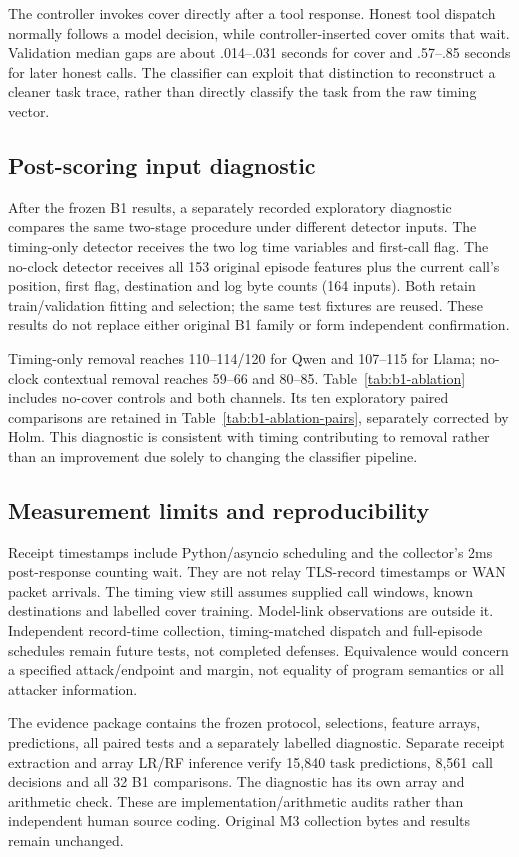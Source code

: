 The controller invokes cover directly after a tool response. Honest tool dispatch normally follows a model decision, while controller-inserted cover omits that wait. Validation median gaps are about .014--.031 seconds for cover and .57--.85 seconds for later honest calls. The classifier can exploit that distinction to reconstruct a cleaner task trace, rather than directly classify the task from the raw timing vector.

\subsection{Post-scoring input diagnostic}
After the frozen B1 results, a separately recorded exploratory diagnostic compares the same two-stage procedure under different detector inputs. The timing-only detector receives the two log time variables and first-call flag. The no-clock detector receives all 153 original episode features plus the current call's position, first flag, destination and log byte counts (164 inputs). Both retain train/validation fitting and selection; the same test fixtures are reused. These results do not replace either original B1 family or form independent confirmation.

Timing-only removal reaches 110--114/120 for Qwen and 107--115 for Llama; no-clock contextual removal reaches 59--66 and 80--85. Table~\ref{tab:b1-ablation} includes no-cover controls and both channels. Its ten exploratory paired comparisons are retained in Table~\ref{tab:b1-ablation-pairs}, separately corrected by Holm. This diagnostic is consistent with timing contributing to removal rather than an improvement due solely to changing the classifier pipeline.




\subsection{Measurement limits and reproducibility}
Receipt timestamps include Python/asyncio scheduling and the collector's 2ms post-response counting wait. They are not relay TLS-record timestamps or WAN packet arrivals. The timing view still assumes supplied call windows, known destinations and labelled cover training. Model-link observations are outside it. Independent record-time collection, timing-matched dispatch and full-episode schedules remain future tests, not completed defenses. Equivalence would concern a specified attack/endpoint and margin, not equality of program semantics or all attacker information.

The evidence package contains the frozen protocol, selections, feature arrays, predictions, all paired tests and a separately labelled diagnostic. Separate receipt extraction and array LR/RF inference verify 15,840 task predictions, 8,561 call decisions and all 32 B1 comparisons. The diagnostic has its own array and arithmetic check. These are implementation/arithmetic audits rather than independent human source coding. Original M3 collection bytes and results remain unchanged.
